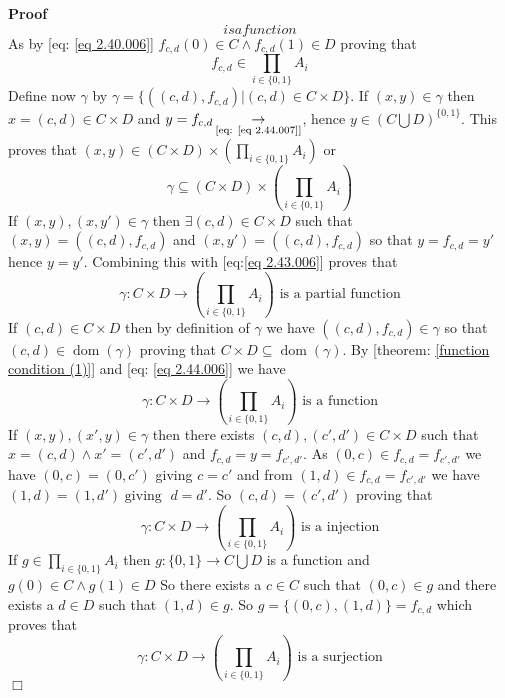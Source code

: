 \documentclass{book}
\newcommand{\Rightarrowlim}{\mathop{\rightarrow}\limits}
\newcommand{\tmop}[1]{\ensuremath{\operatorname{#1}}}
\newenvironment{proof}{\noindent\textbf{Proof\ }}{\hspace*{\fill}$\Box$\medskip}
\begin{document}
\begin{proof}
\begin{equation}
{    is a function}
  \end{equation}
  As by [eq: \ref{eq 2.40.006}] $f_{c, d} (0) \in C \wedge f_{c, d} (1) \in D$
  proving that
  \begin{equation}
    \label{eq 2.44.007} f_{c, d} \in \prod_{i \in \{ 0, 1 \}} A_i
  \end{equation}
  Define now $\gamma$ by $\gamma = \{ ((c, d), f_{c, d}) | (c, d) \in C \times
  D \}$. If $(x, y) \in \gamma$ then $x = (c, d) \in C \times D$ and $y =
  f_{c, d} \Rightarrowlim_{\text{[eq: \ref{eq 2.44.007}]}}$, hence $y \in
  \left( C \bigcup D \right)^{\{ 0, 1 \}}$. This proves that $(x, y) \in (C
  \times D) \times \left( \prod_{i \in \{ 0, 1 \}} A_i \right)$ or
  \begin{equation}
    \label{eq 2.43.006} \gamma \subseteq (C \times D) \times \left( \prod_{i
    \in \{ 0, 1 \}} A_i \right)
  \end{equation}
  If $(x, y), (x, y') \in \gamma$ then $\exists (c, d) \in C \times D$ such
  that $(x, y) = ((c, d), f_{c, d})$ and $(x, y') = ((c, d), f_{c, d})$ so
  that $y = f_{c, d} = y'$ hence $y = y'$. Combining this with [eq:\ref{eq
  2.43.006}] proves that
  \begin{equation}
    \label{eq 2.44.006} \gamma : C \times D \rightarrow \left( \prod_{i \in \{
    0, 1 \}} A_i \right) \text{ is a partial function}
  \end{equation}
  If $(c, d) \in C \times D$ then by definition of $\gamma$ we have $((c, d),
  f_{c, d}) \in \gamma$ so that $(c, d) \in \tmop{dom} (\gamma)$ proving that
  $C \times D \subseteq \tmop{dom} (\gamma)$. By [theorem: \ref{function
  condition (1)}] and [eq: \ref{eq 2.44.006}] we have
  \begin{equation}
    \label{eq 2.45.006} \gamma : C \times D \rightarrow \left( \prod_{i \in \{
    0, 1 \}} A_i \right) \text{ is a function}
  \end{equation}
  If $(x, y), (x', y) \in \gamma$ then there exists $(c, d), (c', d') \in C
  \times D$ such that $x = (c, d) \wedge x' = (c', d')$ and $f_{c, d} = y =
  f_{c', d'}$. As $(0, c) \in f_{c, d} = f_{c', d'}$ we have $(0, c) = (0,
  c')$ giving $c = c'$ and from $(1, d) \in f_{c, d} = f_{c', d'}$ we have
  $(1, d) = (1, d') \tmop{giving}$ $d = d'$. So $(c, d) = (c', d')$ proving
  that
  \[ \gamma : C \times D \rightarrow \left( \prod_{i \in \{ 0, 1 \}} A_i
     \right) \text{ is a injection} \]
  If $g \in \prod_{i \in \{ 0, 1 \}} A_i$ then $g : \{ 0, 1 \} \rightarrow C
  \bigcup D$ is a function and $g (0) \in C \wedge g (1) \in D$ So there
  exists a $c \in C$ such that $(0, c) \in g$ and there exists a $d \in D$
  such that $(1, d) \in g$. So $g = \{ (0, c), (1, d) \} = f_{c, d}$ which
  proves that
  \[ \gamma : C \times D \rightarrow \left( \prod_{i \in \{ 0, 1 \}} A_i
     \right) \text{ is a surjection} \]
\end{proof}
\end{document}
